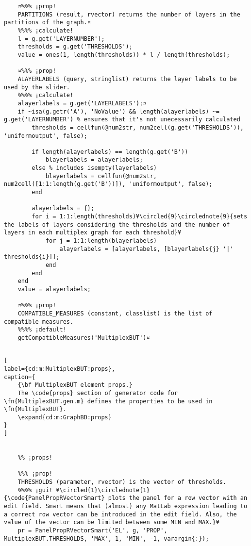 \documentclass{tufte-handout}
\begin{document}
\begin{lstlisting}
	¤%%% ¡prop!
	PARTITIONS (result, rvector) returns the number of layers in the partitions of the graph.¤
	%%%% ¡calculate!
	l = g.get('LAYERNUMBER');
	thresholds = g.get('THRESHOLDS');
	value = ones(1, length(thresholds)) * l / length(thresholds);
	
	¤%%% ¡prop!
	ALAYERLABELS (query, stringlist) returns the layer labels to be used by the slider.
	%%%% ¡calculate!
	alayerlabels = g.get('LAYERLABELS');¤
	if ~isa(g.getr('A'), 'NoValue') && length(alayerlabels) ~= g.get('LAYERNUMBER') % ensures that it's not unecessarily calculated
		thresholds = cellfun(@num2str, num2cell(g.get('THRESHOLDS')), 'uniformoutput', false);

		if length(alayerlabels) == length(g.get('B'))
			blayerlabels = alayerlabels;
		else % includes isempty(layerlabels)
			blayerlabels = cellfun(@num2str, num2cell([1:1:length(g.get('B'))]), 'uniformoutput', false);
		end
	
		alayerlabels = {};
		for i = 1:1:length(thresholds)¥\circled{9}\circlednote{9}{sets the labels of layers considering the thresholds and the number of layers in each multiplex graph for each threshold}¥
			for j = 1:1:length(blayerlabels)
				alayerlabels = [alayerlabels, [blayerlabels{j} '|' thresholds{i}]];
			end
		end
	end
	value = alayerlabels;
	
	¤%%% ¡prop! 
	COMPATIBLE_MEASURES (constant, classlist) is the list of compatible measures.
	%%%% ¡default!
	getCompatibleMeasures('MultiplexBUT')¤
	
\end{lstlisting}



\begin{lstlisting}[
label={cd:m:MultiplexBUT:props},
caption={
	{\bf MultiplexBUT element props.}
	The \code{props} section of generator code for \fn{MultiplexBUT.gen.m} defines the properties to be used in \fn{MultiplexBUT}.
	\expand{cd:m:GraphBD:props}
}
]

	
	%% ¡props!
	
	%%% ¡prop!
	THRESHOLDS (parameter, rvector) is the vector of thresholds.
	%%%% ¡gui! ¥\circled{1}\circlednote{1}{\code{PanelPropRVectorSmart} plots the panel for a row vector with an edit field. Smart means that (almost) any MatLab expression leading to a correct row vector can be introduced in the edit field. Also, the value of the vector can be limited between some MIN and MAX.}¥
	pr = PanelPropRVectorSmart('EL', g, 'PROP', MultiplexBUT.THRESHOLDS, 'MAX', 1, 'MIN', -1, varargin{:});
	
	
\end{lstlisting}
\end{document}
